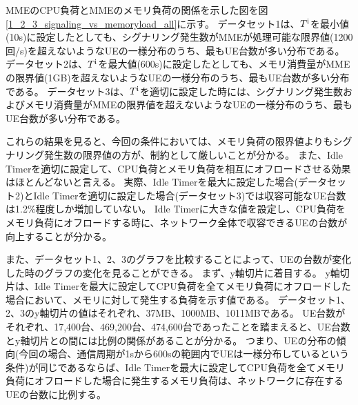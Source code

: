 \documentclass[a4j]{ujarticle}
\begin{document}
%
%
%

\clearpage
MMEのCPU負荷とMMEのメモリ負荷の関係を示した図を図\ref{1_2_3_signaling_vs_memoryload_all}に示す。
データセット1は、$T^{\rm i}$を最小値(10s)に設定したとしても、シグナリング発生数がMMEが処理可能な限界値(1200回/s)を超えないようなUEの一様分布のうち、最もUE台数が多い分布である。
データセット2は、$T^{\rm i}$を最大値(600s)に設定したとしても、メモリ消費量がMMEの限界値(1GB)を超えないようなUEの一様分布のうち、最もUE台数が多い分布である。
データセット3は、$T^{\rm i}$を適切に設定した時には、シグナリング発生数およびメモリ消費量がMMEの限界値を超えないようなUEの一様分布のうち、最もUE台数が多い分布である。

これらの結果を見ると、今回の条件においては、メモリ負荷の限界値よりもシグナリング発生数の限界値の方が、制約として厳しいことが分かる。
また、Idle Timerを適切に設定して、CPU負荷とメモリ負荷を相互にオフロードさせる効果はほとんどないと言える。
実際、Idle Timerを最大に設定した場合(データセット2)とIdle Timerを適切に設定した場合(データセット3)では収容可能なUE台数は1.2\%程度しか増加していない。
Idle Timerに大きな値を設定し、CPU負荷をメモリ負荷にオフロードする時に、ネットワーク全体で収容できるUEの台数が向上することが分かる。

また、データセット1、2、3のグラフを比較することによって、UEの台数が変化した時のグラフの変化を見ることができる。
まず、y軸切片に着目する。
y軸切片は、Idle Timerを最大に設定してCPU負荷を全てメモリ負荷にオフロードした場合において、メモリに対して発生する負荷を示す値である。
データセット1、2、3のy軸切片の値はそれぞれ、37MB、1000MB、1011MBである。
UE台数がそれぞれ、17,400台、469,200台、474,600台であったことを踏まえると、UE台数とy軸切片との間には比例の関係があることが分かる。
つまり、UEの分布の傾向(今回の場合、通信周期が1sから600sの範囲内でUEは一様分布しているという条件)が同じであるならば、Idle Timerを最大に設定してCPU負荷を全てメモリ負荷にオフロードした場合に発生するメモリ負荷は、ネットワークに存在するUEの台数に比例する。
\end{document}
